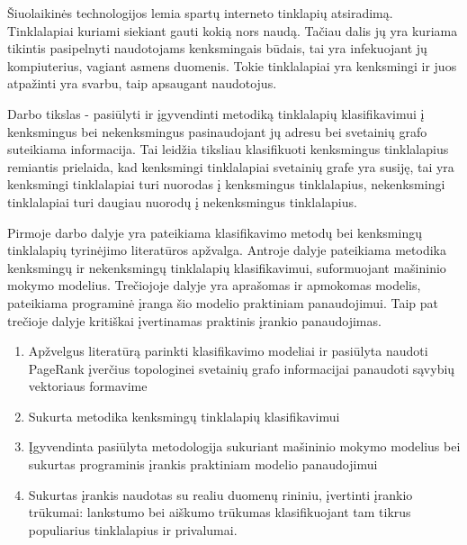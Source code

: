 \documentclass[12pt, a4paper, onecolumn, titlepage, oneside, intlimits]{report}
\begin{document}
\ktuinit{}

\newpage


Šiuolaikinės technologijos lemia spartų interneto tinklapių atsiradimą. Tinklalapiai kuriami siekiant gauti kokią nors naudą. Tačiau dalis jų yra kuriama tikintis pasipelnyti naudotojams kenksmingais būdais, tai yra infekuojant jų kompiuterius, vagiant asmens duomenis. Tokie tinklalapiai yra kenksmingi ir juos atpažinti yra svarbu, taip apsaugant naudotojus.

Darbo tikslas - pasiūlyti ir įgyvendinti metodiką tinklalapių klasifikavimui į kenksmingus bei nekenksmingus pasinaudojant jų adresu bei svetainių grafo suteikiama informacija. Tai leidžia tiksliau klasifikuoti kenksmingus tinklalapius remiantis prielaida, kad kenksmingi tinklalapiai svetainių grafe yra susiję, tai yra kenksmingi tinklalapiai turi nuorodas į kenksmingus tinklalapius, nekenksmingi tinklalapiai turi daugiau nuorodų į nekenksmingus tinklalapius.

Pirmoje darbo dalyje yra pateikiama klasifikavimo metodų bei kenksmingų tinklalapių tyrinėjimo literatūros apžvalga. Antroje dalyje pateikiama metodika kenksmingų ir nekenksmingų tinklalapių klasifikavimui, suformuojant mašininio mokymo modelius. Trečiojoje dalyje yra aprašomas ir apmokomas modelis, pateikiama programinė įranga šio modelio praktiniam panaudojimui. Taip pat trečioje dalyje kritiškai įvertinamas praktinis įrankio panaudojimas.

\newpage










\newpage




\newpage








\begin{enumerate}[label=\arabic*.]
\item Apžvelgus literatūrą parinkti klasifikavimo modeliai ir pasiūlyta naudoti PageRank įverčius topologinei svetainių grafo informacijai panaudoti sąvybių vektoriaus formavime
\item Sukurta metodika kenksmingų tinklalapių klasifikavimui
\item Įgyvendinta pasiūlyta metodologija sukuriant mašininio mokymo modelius bei sukurtas programinis įrankis praktiniam modelio panaudojimui
\item Sukurtas įrankis naudotas su realiu duomenų rininiu, įvertinti įrankio trūkumai: lankstumo bei aiškumo trūkumas klasifikuojant tam tikrus populiarius tinklalapius ir privalumai.
\end{enumerate}
\end{document}
